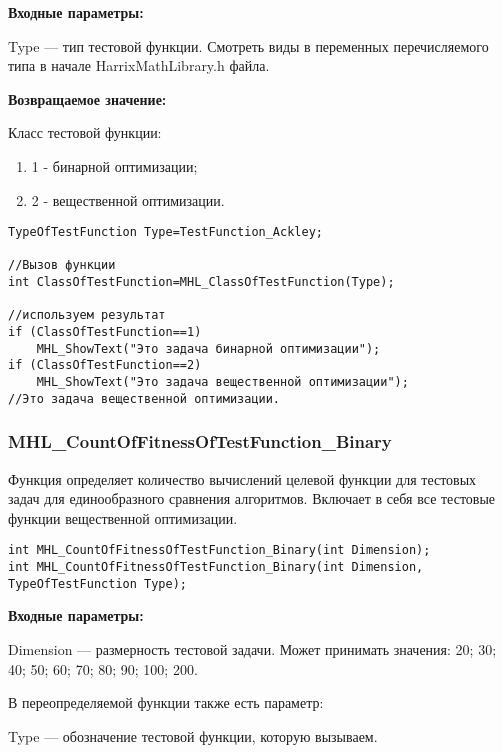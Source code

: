 \documentclass[a4paper,12pt]{article}
\begin{document}
\textbf{Входные параметры:}

Type --- тип тестовой функции. Смотреть виды в переменных перечисляемого типа в начале HarrixMathLibrary.h файла.

\textbf{Возвращаемое значение:}

Класс тестовой функции:

\begin{enumerate}
\item 1 - бинарной оптимизации;
\item 2 - вещественной оптимизации.
\end{enumerate}


\begin{lstlisting}[label=code_use_MHL_ClassOfTestFunction,caption=Пример использования]
TypeOfTestFunction Type=TestFunction_Ackley;

//Вызов функции
int ClassOfTestFunction=MHL_ClassOfTestFunction(Type);

//используем результат
if (ClassOfTestFunction==1)
    MHL_ShowText("Это задача бинарной оптимизации");
if (ClassOfTestFunction==2)
    MHL_ShowText("Это задача вещественной оптимизации");
//Это задача вещественной оптимизации.
\end{lstlisting}

\subsubsection{MHL\_CountOfFitnessOfTestFunction\_Binary}\label{MHL_CountOfFitnessOfTestFunction_Binary}

Функция определяет количество вычислений целевой функции для тестовых задач для единообразного сравнения алгоритмов. Включает в себя все тестовые функции вещественной оптимизации.


\begin{lstlisting}[label=code_syntax_MHL_CountOfFitnessOfTestFunction_Binary,caption=Синтаксис]
int MHL_CountOfFitnessOfTestFunction_Binary(int Dimension);
int MHL_CountOfFitnessOfTestFunction_Binary(int Dimension, TypeOfTestFunction Type);
\end{lstlisting}

\textbf{Входные параметры:}

Dimension --- размерность тестовой задачи. Может принимать значения: 20; 30; 40; 50; 60; 70; 80; 90; 100; 200.

В переопределяемой функции также есть параметр:
  
Type --- обозначение тестовой функции, которую вызываем. 
\end{document}
